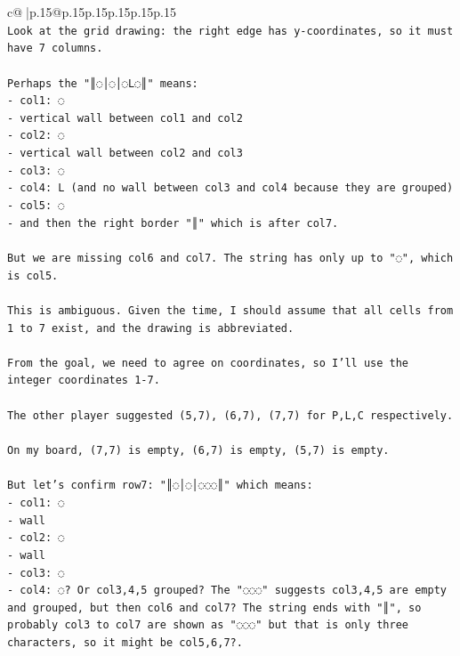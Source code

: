\documentclass{article}
\begin{document}
{\begin{supertabular}{c@{$\;$}|p{.15\linewidth}@{}p{.15\linewidth}p{.15\linewidth}p{.15\linewidth}p{.15\linewidth}p{.15\linewidth}}
{{{\\ 
\texttt{Look at the grid drawing: the right edge has y{-}coordinates, so it must have 7 columns.} \\
\\ 
\texttt{Perhaps the "║◌│◌│◌L◌║" means:} \\
\texttt{{-} col1: ◌} \\
\texttt{{-} vertical wall between col1 and col2} \\
\texttt{{-} col2: ◌} \\
\texttt{{-} vertical wall between col2 and col3} \\
\texttt{{-} col3: ◌} \\
\texttt{{-} col4: L  (and no wall between col3 and col4 because they are grouped)} \\
\texttt{{-} col5: ◌} \\
\texttt{{-} and then the right border "║" which is after col7.} \\
\\ 
\texttt{But we are missing col6 and col7. The string has only up to "◌", which is col5.} \\
\\ 
\texttt{This is ambiguous. Given the time, I should assume that all cells from 1 to 7 exist, and the drawing is abbreviated.} \\
\\ 
\texttt{From the goal, we need to agree on coordinates, so I'll use the integer coordinates 1{-}7.} \\
\\ 
\texttt{The other player suggested (5,7), (6,7), (7,7) for P,L,C respectively.} \\
\\ 
\texttt{On my board, (7,7) is empty, (6,7) is empty, (5,7) is empty.} \\
\\ 
\texttt{But let's confirm row7: "║◌│◌│◌◌◌║" which means:} \\
\texttt{{-} col1: ◌} \\
\texttt{{-} wall} \\
\texttt{{-} col2: ◌} \\
\texttt{{-} wall} \\
\texttt{{-} col3: ◌} \\
\texttt{{-} col4: ◌? Or col3,4,5 grouped? The "◌◌◌" suggests col3,4,5 are empty and grouped, but then col6 and col7? The string ends with "║", so probably col3 to col7 are shown as "◌◌◌" but that is only three characters, so it might be col5,6,7?.} \\
}}}
\end{supertabular}}
\end{document}
